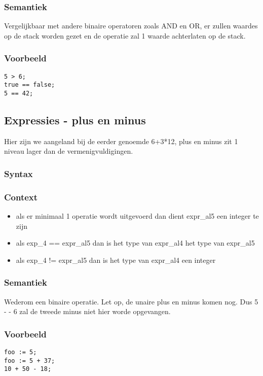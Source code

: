 \documentclass[]{article}
\begin{document}
\subsubsection{Semantiek}
Vergelijkbaar met andere binaire operatoren zoals AND en OR, er zullen waardes op de stack worden gezet en de operatie zal 1 waarde achterlaten op de stack.
\subsubsection{Voorbeeld}
\begin{lstlisting}[style=SELMA]
5 > 6;
true == false;
5 == 42;
\end{lstlisting}

\subsection{Expressies - plus en minus}
Hier zijn we aangeland bij de eerder genoemde 6+3*12, plus en minus zit 1 niveau lager dan de vermenigvuldigingen.
\subsubsection{Syntax}

\subsubsection{Context}
\begin{itemize}
\item als er minimaal 1 operatie wordt uitgevoerd dan dient expr\_al5 een integer te zijn
\item als exp\_4 == expr\_al5 dan is het type van expr\_al4 het type van expr\_al5
\item als exp\_4 != expr\_al5 dan is het type van expr\_al4 een integer
\end{itemize}
\subsubsection{Semantiek}
Wederom een binaire operatie. Let op, de unaire plus en minus komen nog. Dus 5 - - 6 zal de tweede minus niet hier worde opgevangen.
\subsubsection{Voorbeeld}
\begin{lstlisting}[style=SELMA]
foo := 5;
foo := 5 + 37;
10 + 50 - 18;
\end{lstlisting}
\end{document}
